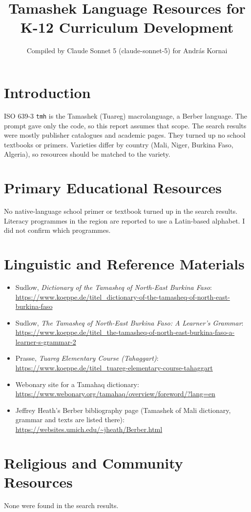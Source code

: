 \documentclass[12pt]{article}
\title{Tamashek Language Resources for K-12 Curriculum Development}
\author{Compiled by Claude Sonnet 5 (claude-sonnet-5) for Andr\'as Kornai}
\date{}
\begin{document}
\maketitle

\section{Introduction}
ISO 639-3 \texttt{tmh} is the Tamashek (Tuareg) macrolanguage, a Berber language. The prompt gave only the code, so this report assumes that scope. The search results were mostly publisher catalogues and academic pages. They turned up no school textbooks or primers. Varieties differ by country (Mali, Niger, Burkina Faso, Algeria), so resources should be matched to the variety.

\section{Primary Educational Resources}
No native-language school primer or textbook turned up in the search results. Literacy programmes in the region are reported to use a Latin-based alphabet. I did not confirm which programmes.

\section{Linguistic and Reference Materials}
\begin{itemize}
\item Sudlow, \textit{Dictionary of the Tamasheq of North-East Burkina Faso}: \url{https://www.koeppe.de/titel_dictionary-of-the-tamasheq-of-north-east-burkina-faso}
\item Sudlow, \textit{The Tamasheq of North-East Burkina Faso: A Learner's Grammar}: \url{https://www.koeppe.de/titel_the-tamasheq-of-north-east-burkina-faso-a-learner-s-grammar-2}
\item Prasse, \textit{Tuareg Elementary Course (Tahaggart)}: \url{https://www.koeppe.de/titel_tuareg-elementary-course-tahaggart}
\item Webonary site for a Tamahaq dictionary: \url{https://www.webonary.org/tamahaq/overview/foreword/?lang=en}
\item Jeffrey Heath's Berber bibliography page (Tamashek of Mali dictionary, grammar and texts are listed there): \url{https://websites.umich.edu/~jheath/Berber.html}
\end{itemize}

\section{Religious and Community Resources}
None were found in the search results.
\end{document}
